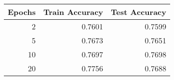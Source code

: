 \begin{tabular}{|r||r|r|}
\hline
Epochs & Train Accuracy & Test Accuracy \\
\hline
2 & 0.7601 & 0.7599 \\
5 & 0.7673 & 0.7651 \\
10 & 0.7697 & 0.7698 \\
20 & 0.7756 & 0.7688 \\
\hline
\end{tabular}

